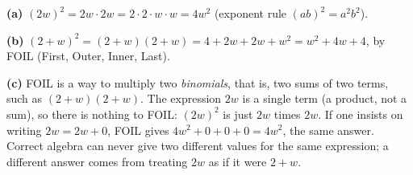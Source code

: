 \textbf{(a)} $(2w)^2=2w\cdot2w=2\cdot2\cdot w\cdot w=\boxed{4w^2}$ (exponent rule $(ab)^2=a^2b^2$).

\textbf{(b)} $(2+w)^2=(2+w)(2+w)=4+2w+2w+w^2=\boxed{w^2+4w+4}$, by FOIL (First, Outer, Inner, Last).

\textbf{(c)} FOIL is a way to multiply two \emph{binomials}, that is, two sums of two terms, such as $(2+w)(2+w)$. The expression $2w$ is a single term (a product, not a sum), so there is nothing to FOIL: $(2w)^2$ is just $2w$ times $2w$. If one insists on writing $2w=2w+0$, FOIL gives $4w^2+0+0+0=4w^2$, the same answer. Correct algebra can never give two different values for the same expression; a different answer comes from treating $2w$ as if it were $2+w$.
